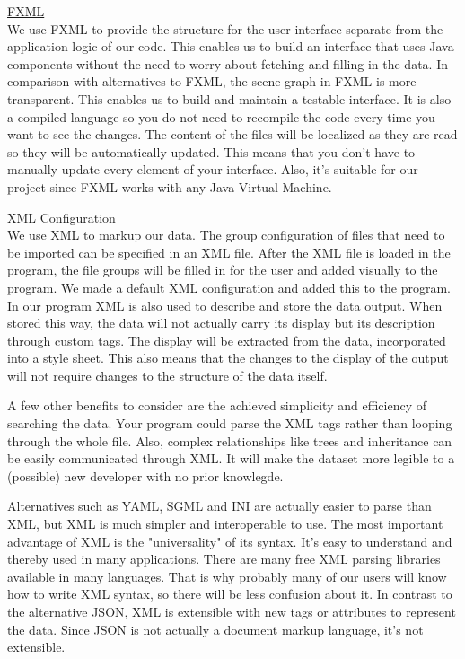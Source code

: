 \documentclass[a4paper,english,fleqn]{exam}
\begin{document}
\underline{FXML} \\ We use FXML to provide the structure for the user interface separate from the application logic of our code. This enables us to build an interface that uses Java components without the need to worry about fetching and filling in the data. In comparison with alternatives to FXML, the scene graph in FXML is more transparent. This enables us to build and maintain a testable interface. It is also a compiled language so you do not need to recompile the code every time you want to see the changes. The content of the files will be localized as they are read so they will be automatically updated. This means that you don't have to manually update every element of your interface. Also, it's suitable for our project since FXML works with any Java Virtual Machine.  

\underline{XML Configuration} \\
We use XML to markup our data. The group configuration of files that need to be imported can be specified in an XML file. After the XML file is loaded in the program, the file groups will be filled in for the user and added visually to the program. We made a default XML configuration and added this to the program. In our program XML is also used to describe and store the data output. When stored this way, the data will not actually carry its display but its description through custom tags. The display will be extracted from the data, incorporated into a style sheet. This also means that the changes to the display of the output will not require changes to the structure of the data itself.

A few other benefits to consider are the achieved simplicity and efficiency of searching the data. Your program could parse the XML tags rather than looping through the whole file. Also, complex relationships like trees and inheritance can be easily communicated through XML. It will make the dataset more legible to a (possible) new developer with no prior knowlegde. 

Alternatives such as YAML, SGML and INI are actually easier to parse than XML, but XML is much simpler and interoperable to use. The most important advantage of XML is the "universality" of its syntax. It's easy to understand and thereby used in many applications. There are many free XML parsing libraries available in many languages. That is why probably many of our users will know how to write XML syntax, so there will be less confusion about it. 
In contrast to the alternative JSON, XML is extensible with new tags or attributes to represent the data. Since JSON is not actually a document markup language, it's not extensible. \\
\end{document}
